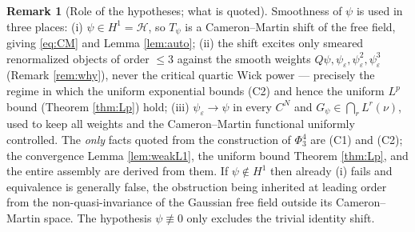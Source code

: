 \documentclass[12pt]{article}
\newcommand{\eps}{\varepsilon}
\theoremstyle{plain}
\theoremstyle{definition}
\newtheorem{remark}{Remark}
\begin{document}
\begin{remark}[Role of the hypotheses; what is quoted]
Smoothness of $\psi$ is used in three places: (i) $\psi\in H^1=\mathcal H$, so $T_\psi$
is a Cameron--Martin shift of the free field, giving \eqref{eq:CM} and Lemma
\ref{lem:auto}; (ii) the shift excites only smeared renormalized objects of order
$\le3$ against the smooth weights $Q\psi,\psi_\eps,\psi_\eps^2,\psi_\eps^3$ (Remark
\ref{rem:why}), never the critical quartic Wick power --- precisely the regime in which
the uniform exponential bounds (C2) and hence the uniform $L^p$ bound (Theorem
\ref{thm:Lp}) hold; (iii) $\psi_\eps\to\psi$ in every $C^N$ and $G_\psi\in\bigcap_r
L^r(\nu)$, used to keep all weights and the Cameron--Martin functional uniformly
controlled. The \emph{only} facts quoted from the construction of $\Phi^4_3$ are (C1)
and (C2); the convergence Lemma \ref{lem:weakL1}, the uniform bound Theorem
\ref{thm:Lp}, and the entire assembly are derived from them. If $\psi\notin H^1$ then
already (i) fails and equivalence is generally false, the obstruction being inherited
at leading order from the non-quasi-invariance of the Gaussian free field outside its
Cameron--Martin space. The hypothesis $\psi\not\equiv0$ only excludes the trivial
identity shift.
\end{remark}
\end{document}
